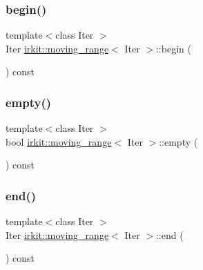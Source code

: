 \mbox{\label{structirkit_1_1moving__range_af58c3dbe1e87c3222ee4a80aa745d9a1}} 
\subsubsection{\texorpdfstring{begin()}{begin()}}
{\footnotesize\ttfamily template$<$class Iter $>$ \\
Iter \hyperlink{structirkit_1_1moving__range}{irkit\+::moving\+\_\+range}$<$ Iter $>$\+::begin (\begin{DoxyParamCaption}{ }\end{DoxyParamCaption}) const\hspace{0.3cm}{\ttfamily [inline]}}

\mbox{\label{structirkit_1_1moving__range_a8d4e48c5d31fbc158da77eec0c90010e}} 
\subsubsection{\texorpdfstring{empty()}{empty()}}
{\footnotesize\ttfamily template$<$class Iter $>$ \\
bool \hyperlink{structirkit_1_1moving__range}{irkit\+::moving\+\_\+range}$<$ Iter $>$\+::empty (\begin{DoxyParamCaption}{ }\end{DoxyParamCaption}) const\hspace{0.3cm}{\ttfamily [inline]}}

\mbox{\label{structirkit_1_1moving__range_a5e5ff06f38d6cdba4735e7dd632759ef}} 
\subsubsection{\texorpdfstring{end()}{end()}}
{\footnotesize\ttfamily template$<$class Iter $>$ \\
Iter \hyperlink{structirkit_1_1moving__range}{irkit\+::moving\+\_\+range}$<$ Iter $>$\+::end (\begin{DoxyParamCaption}{ }\end{DoxyParamCaption}) const\hspace{0.3cm}{\ttfamily [inline]}}

